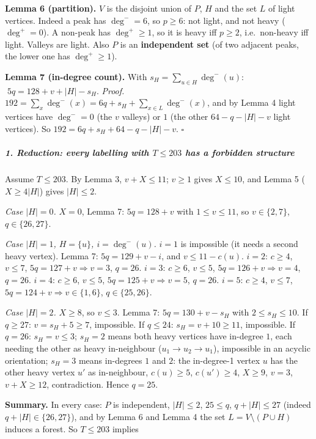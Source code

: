 \documentclass[11pt,a4paper]{article}
\begin{document}
\textbf{Lemma 6 (partition).} \(V\) is the disjoint union of \(P\),
\(H\) and the set \(L\) of light vertices. Indeed a peak has
\(\deg^-=6\), so \(p\ge6\): not light, and not heavy (\(\deg^+=0\)). A
non-peak has \(\deg^+\ge1\), so it is heavy iff \(p\ge2\),
i.e.~non-heavy iff light. Valleys are light. Also \(P\) is an
\textbf{independent set} (of two adjacent peaks, the lower one has
\(\deg^+\ge1\)).

\textbf{Lemma 7 (in-degree count).} With \(s_H=\sum_{u\in H}\deg^-(u)\):
\(\;5q=128+v+|H|-s_H\). \emph{Proof.}
\(192=\sum_x\deg^-(x)=6q+s_H+\sum_{x\in L}\deg^-(x)\), and by Lemma 4
light vertices have \(\deg^-=0\) (the \(v\) valleys) or \(1\) (the other
\(64-q-|H|-v\) light vertices). So \(192=6q+s_H+64-q-|H|-v\).
\(\square\)

\subparagraph{\texorpdfstring{1. Reduction: every labelling with
\(T\le203\) has a forbidden
structure}{1. Reduction: every labelling with T\textbackslash le203 has a forbidden structure}}\label{reduction-every-labelling-with-tle203-has-a-forbidden-structure}

Assume \(T\le203\). By Lemma 3, \(v+X\le11\); \(v\ge1\) gives
\(X\le10\), and Lemma 5 (\(X\ge4|H|\)) gives \(|H|\le2\).

\emph{Case \(|H|=0\).} \(X=0\), Lemma 7: \(5q=128+v\) with
\(1\le v\le11\), so \(v\in\{2,7\}\), \(q\in\{26,27\}\).

\emph{Case \(|H|=1\), \(H=\{u\}\), \(i=\deg^-(u)\).} \(i=1\) is
impossible (it needs a second heavy vertex). Lemma 7: \(5q=129+v-i\),
and \(v\le11-c(u)\). \(i=2\): \(c\ge4\), \(v\le7\),
\(5q=127+v\Rightarrow v=3\), \(q=26\). \(i=3\): \(c\ge6\), \(v\le5\),
\(5q=126+v\Rightarrow v=4\), \(q=26\). \(i=4\): \(c\ge6\), \(v\le5\),
\(5q=125+v\Rightarrow v=5\), \(q=26\). \(i=5\): \(c\ge4\), \(v\le7\),
\(5q=124+v\Rightarrow v\in\{1,6\}\), \(q\in\{25,26\}\).

\emph{Case \(|H|=2\).} \(X\ge8\), so \(v\le3\). Lemma 7:
\(5q=130+v-s_H\) with \(2\le s_H\le10\). If \(q\ge27\): \(v=s_H+5\ge7\),
impossible. If \(q\le24\): \(s_H=v+10\ge11\), impossible. If \(q=26\):
\(s_H=v\le3\); \(s_H=2\) means both heavy vertices have in-degree \(1\),
each needing the other as heavy in-neighbour (\(u_1\to u_2\to u_1\)),
impossible in an acyclic orientation; \(s_H=3\) means in-degrees \(1\)
and \(2\): the in-degree-1 vertex \(u\) has the other heavy vertex
\(u'\) as in-neighbour, \(c(u)\ge5\), \(c(u')\ge4\), \(X\ge9\), \(v=3\),
\(v+X\ge12\), contradiction. Hence \(q=25\).

\textbf{Summary.} In every case: \(P\) is independent, \(|H|\le2\),
\(25\le q\), \(q+|H|\le27\) (indeed \(q+|H|\in\{26,27\}\)), and by Lemma
6 and Lemma 4 the set \(L=V\setminus(P\cup H)\) induces a forest. So
\(T\le203\) implies
\end{document}
